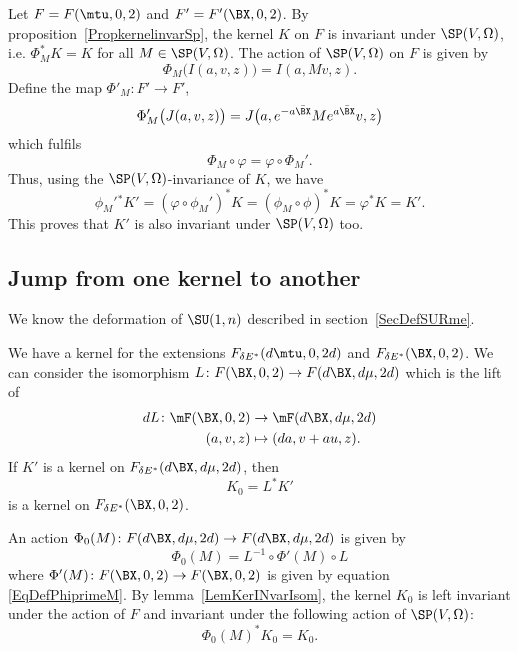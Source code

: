 Let $F=F(\mtu,0,2)$ and $F'=F'(\BX,0,2)$. By proposition~\ref{PropkernelinvarSp},  the kernel $K$ on $F$ is invariant under $\SP(V,\Omega)$, i.e. $\Phi^*_{M}K=K$ for all $M\in\SP(V,\Omega)$. The action of $\SP(V,\Omega)$ on $F$ is given by
\[
  \Phi_{M}\big( I(a,v,z) \big)=I(a,Mv,z).
\]
Define the map $\Phi'_M\colon F'\to F'$,
\begin{equation}   \label{EqDefPhiprimeM}
\Phi_{M}'\big( J(a,v,z) \big)=J\big( a, e^{-a\bar{\BX }}M e^{a\bar{\BX }}v,z \big)
\end{equation}
which fulfils
\[
  \Phi_{M}\circ\varphi=\varphi\circ\Phi_{M}'.
\]
Thus, using the $\SP(V,\Omega)$-invariance of $K$, we have
\[
\phi_{M}'{}^*K'=(\varphi\circ\phi_{M}')^*K=(\phi_{M}\circ\phi)^*K=\varphi^*K=K'.
\]
This proves that $K'$ is also invariant under $\SP(V,\Omega)$ too.

\subsection{Jump from one kernel to another}

We know the deformation of $\SU(1,n)$ described in section~\ref{SecDefSURme}.

We have a kernel for the extensions $F_{\delta E^*}(d\mtu,0,2d)$ and $F_{\delta E^*}(\BX ,0,2)$. We can consider the isomorphism $L\colon F(\BX ,0,2)\to F(d\BX ,d\mu,2d)$ which is the lift of
\begin{equation}
\begin{aligned}
 dL\colon \mF(\BX ,0,2)&\to \mF(d\BX ,d\mu,2d) \\
  (a,v,z)&\mapsto (da,v+au,z).
\end{aligned}
\end{equation}
If $K'$ is a kernel on $F_{\delta E^*}(d\BX ,d\mu,2d)$, then
\[
  K_{0}=L^*K'
\]
is a kernel on $F_{\delta E^*}(\BX ,0,2)$.

An action $\Phi_{0}(M)\colon F(d\BX ,d\mu,2d)\to F(d\BX ,d\mu,2d)$ is given by
\begin{equation}
  \Phi_{0}(M)=L^{-1}\circ\Phi'(M)\circ L
\end{equation}
where $\Phi'(M)\colon F(\BX ,0,2)\to F(\BX ,0,2)$ is given by equation \eqref{EqDefPhiprimeM}. By lemma~\ref{LemKerINvarIsom}, the kernel $K_{0}$ is left invariant under the action of $F$ and invariant under the following action of $\SP(V,\Omega)$:
\[
  \Phi_{0}(M)^*K_{0}=K_{0}.
\]

